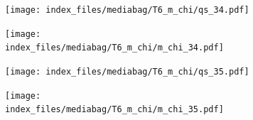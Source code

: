 \documentclass[
  11pt,
  letterpaper,
]{scrreprt}
\begin{document}
\begin{figure}

\begin{minipage}{0.50\linewidth}

\begin{figure}[H]

{\centering \texttt{[image: index\_files/mediabag/T6\_m\_chi/qs\_34.pdf]}

}


\end{figure}%

\end{minipage}%
%
\begin{minipage}{0.50\linewidth}

\begin{figure}[H]

{\centering \texttt{[image: index\_files/mediabag/T6\_m\_chi/m\_chi\_34.pdf]}

}


\end{figure}%

\end{minipage}%

\end{figure}%

\begin{figure}

\begin{minipage}{0.50\linewidth}

\begin{figure}[H]

{\centering \texttt{[image: index\_files/mediabag/T6\_m\_chi/qs\_35.pdf]}

}


\end{figure}%

\end{minipage}%
%
\begin{minipage}{0.50\linewidth}

\begin{figure}[H]

{\centering \texttt{[image: index\_files/mediabag/T6\_m\_chi/m\_chi\_35.pdf]}

}


\end{figure}%

\end{minipage}%

\end{figure}%
\end{document}
